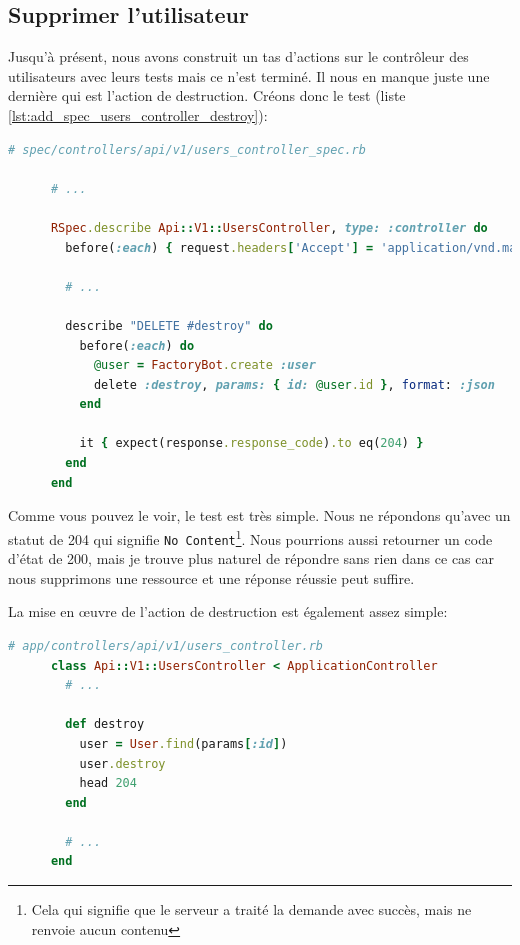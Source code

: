 \documentclass[]{report}
\begin{document}
    \subsection{Supprimer l'utilisateur}

      Jusqu'à présent, nous avons construit un tas d'actions sur le contrôleur des utilisateurs avec leurs tests mais ce n'est terminé. Il nous en manque juste une dernière qui est l'action de destruction. Créons donc le test (liste \ref{lst:add_spec_users_controller_destroy}):

      \begin{scriptsize}
      \begin{lstlisting}[language=ruby, caption={Les tests du contrôlleur utilisateur avec les test de destruction}, label={lst:add_spec_users_controller_destroy}]
      # spec/controllers/api/v1/users_controller_spec.rb

      # ...

      RSpec.describe Api::V1::UsersController, type: :controller do
        before(:each) { request.headers['Accept'] = 'application/vnd.marketplace.v1' }

        # ...

        describe "DELETE #destroy" do
          before(:each) do
            @user = FactoryBot.create :user
            delete :destroy, params: { id: @user.id }, format: :json
          end

          it { expect(response.response_code).to eq(204) }
        end
      end
      \end{lstlisting}
      \end{scriptsize}

      Comme vous pouvez le voir, le test est très simple. Nous ne répondons qu'avec un statut de 204 qui signifie \verb|No Content|\footnote{Cela qui signifie que le serveur a traité la demande avec succès, mais ne renvoie aucun contenu}. Nous pourrions aussi retourner un code d'état de 200, mais je trouve plus naturel de répondre sans rien dans ce cas car nous supprimons une ressource et une réponse réussie peut suffire.

      La mise en œuvre de l'action de destruction est également assez simple:

      \begin{scriptsize}
      \begin{lstlisting}[language=ruby]
      # app/controllers/api/v1/users_controller.rb
      class Api::V1::UsersController < ApplicationController
        # ...

        def destroy
          user = User.find(params[:id])
          user.destroy
          head 204
        end

        # ...
      end
      \end{lstlisting}
      \end{scriptsize}
\end{document}

